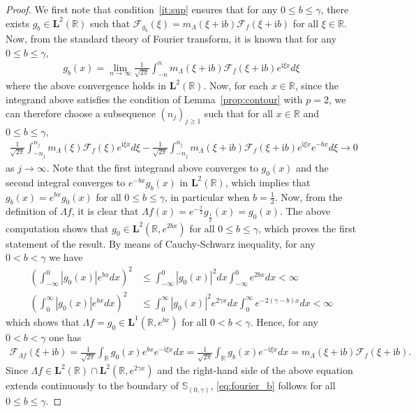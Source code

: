 \documentclass[12pt]{amsart}
\numberwithin{equation}{section}
\newcommand{\bb}{\mathbb}
\renewcommand{\ge}{\geqslant}
\renewcommand{\le}{\leqslant}
\newcommand{\bmrm}[2][2]{\mathbf{#2}^{#1}}
\newcommand{\fou}{\mathcal{F}}
\renewcommand{\i}{\mathrm{i}}
\theoremstyle{definition}
\theoremstyle{assump}
\theoremstyle{remark}
\begin{document}
\begin{proof} We first note that condition~\eqref{it:sup} ensures that for any $0\le b\le \gamma$, there exists $g_b\in\bmrm{L}(\bb R)$ such that $\fou_{\! g_b}(\xi)=m_{\Lambda}(\xi+\i b)\fou_f(\xi+\i b)$ for all $\xi\in\bb R$. Now, from the standard theory of Fourier transform, it is known that for any $0\le b\le \gamma$,
\begin{align*}
	g_b(x)=\lim_{n\to\infty}\frac{1}{\sqrt{2\pi}}\int_{-n}^n m_{\Lambda}(\xi+\i b)\fou_f(\xi+\i b) e^{\i\xi x} d\xi
\end{align*}
where the above convergence holds in $\bmrm{L}(\bb R)$. Now, for each $x\in\bb R$, since the integrand above satisfies the condition of Lemma~\ref{prop:contour} with $p=2$, we can therefore choose a subsequence $(n_j)_{j\ge 1}$ such that for all $x\in\bb R$ and $0\le b\le\gamma$,
\begin{align*}
	\frac{1}{\sqrt{2\pi}}\int_{-n_j}^{n_j}m_\Lambda(\xi)\fou_f(\xi) e^{\i\xi x}d\xi-\frac{1}{\sqrt{2\pi}}\int_{-n_j}^{n_j} m_{\Lambda}(\xi+\i b)\fou_f(\xi+\i b) e^{\i\xi x} e^{-bx} d\xi\to 0
\end{align*}
as $j\to\infty$. Note that the first integrand above converges to $g_0(x)$ and the second integral converges to $e^{-bx}g_b(x)$ in $\bmrm{L}(\bb R)$, which implies that $g_b(x)=e^{bx} g_0(x)$ for all $0\le b\le \gamma$, in particular when $b=\frac{1}{2}$. Now, from the definition of $\Lambda f$, it is clear that $\Lambda f(x)=e^{-\frac{x}{2}}g_{\frac{1}{2}}(x)=g_0(x)$. The above computation shows that $g_0\in\bmrm{L}(\bb R, e^{2bx})$ for all $0\le b\le \gamma$, which proves the first statement of the result. By means of Cauchy-Schwarz inequality, for any $0<b<\gamma$ we have
\begin{align*}
	\left(\int_{-\infty}^0 |g_0(x)|e^{bx} dx\right)^2&\le\int_{-\infty}^0 |g_0(x)|^2dx\int_{-\infty}^0 e^{2bx}dx<\infty \\
	\left(\int_{0}^\infty |g_0(x)| e^{bx}dx\right)^2&\le\int_{0}^\infty |g_0(x)|^2 e^{2\gamma x}dx\int_0^\infty e^{-2(\gamma-b)x} dx<\infty
\end{align*}
which shows that $\Lambda f=g_0\in \mathbf{L}^1(\bb R, e^{bx})$ for all $0<b<\gamma$. Hence, for any $0<b<\gamma$ one has
\begin{align*}
	\fou_{\Lambda f}(\xi+\i b)=\frac{1}{\sqrt{2\pi}}\int_{\bb R} g_0(x)e^{bx}e^{-\i \xi x} dx=\frac{1}{\sqrt{2\pi}}\int_{\bb R} g_b(x)e^{-\i \xi x} dx=m_{\Lambda}(\xi+\i b)\fou_f(\xi+\i b).
\end{align*}
Since $\Lambda f\in\bmrm{L}(\bb R)\cap \bmrm{L}(\bb R, e^{2\gamma x})$ and the right-hand side of the above equation extends continuously to the boundary of $\bb{S}_{(0,\gamma)}$, \eqref{eq:fourier_b} follows for all $0\le b\le \gamma$.

\end{proof}
\end{document}
